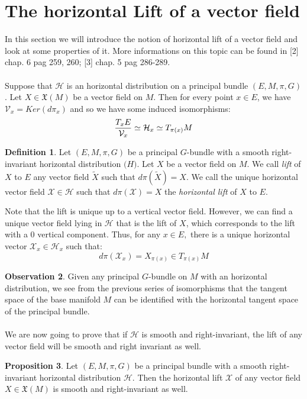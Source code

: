 \documentclass[12pt,a4paper]{report}
\theoremstyle{definition}
\newtheorem{Def}{Definition}[chapter]
\theoremstyle{Theorem}
\newtheorem{Prop}[Def]{Proposition}
\theoremstyle{definition}
\theoremstyle{definition}
\newtheorem{Obs}[Def]{Observation}
\begin{document}
		\section{The horizontal Lift of a vector field}
		In this section we will introduce the notion of horizontal lift of a vector field and look at some properties of it. More informations on this topic can be found in [2] chap. 6 pag 259, 260; [3] chap. 5 pag 286-289.\\
		\\
		Suppose that $\mathcal{H}$ is an horizontal distribution on a principal bundle $(E,M,\pi,G)$. Let $X\in\mathfrak{X}(M)$ be a vector field on $M$. Then for every point $x\in E$, we have $\mathcal{V}_{x}=Ker(d\pi_{x})$ and so we have some induced isomorphisms:
		$${T_{x}E\over \mathcal{V}_{x}}\simeq \mathcal{H}_{x}\simeq T_{\pi(x)}M$$
		\begin{Def}
			Let $(E,M,\pi,G)$ be a principal $G$-bundle with a smooth right-invariant horizontal distribution $\mathcal(H)$. Let $X$ be a vector field on $M$. We call \textit{lift} of $X$ to $E$ any vector field $\tilde{X}$ such that $d\pi(\tilde{X})=X$. We call the unique horizontal vector field $\mathcal{X}\in \mathcal{H}$ such that $d\pi(\mathcal{X})=X$ the \textit{horizontal lift} of $X$ to $E$.
		\end{Def}
		Note that the lift is unique up to a vertical vector field. However, we can find a unique vector field lying in $\mathcal{H}$ that is the lift of $X$, which corresponds to the lift with a 0 vertical component.
		Thus, for any $x\in E,$ there is a unique horizontal vector $\mathcal{X}_{x}\in\mathcal{H}_{x}$ such that:
		$$d\pi(\mathcal{X}_{x})=X_{\pi(x)}\in T_{\pi(x)}M$$
		\begin{Obs}
			Given any principal $G$-bundle on $M$ with an horizontal distribution, we see from the previous series of isomorphisms that the tangent space of the base manifold $M$ can be identified with the horizontal tangent space of the principal bundle.\\
			\\
			We are now going to prove that if $\mathcal{H}$ is smooth and right-invariant, the lift of any vector field will be smooth and right invariant as well.
		\end{Obs}
		\begin{Prop}
			Let $(E,M,\pi,G)$ be a principal bundle with a smooth right-invariant horizontal distribution $\mathcal{H}$. Then the horizontal lift $\mathcal{X}$ of any vector field $X\in\mathfrak{X}(M)$ is smooth and right-invariant as well.
		\end{Prop}
\end{document}
